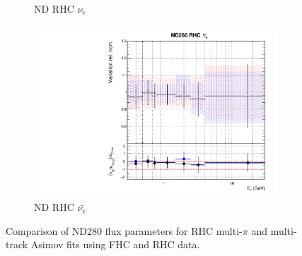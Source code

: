 \begin{figure}[t]
\begin{subfigure}{0.42\textwidth}
  \caption{ND RHC $\nu_{e}$}
\end{subfigure}
\begin{subfigure}{0.42\textwidth}
  \centering
  \includegraphics[width=0.75\linewidth]{figs/rhcmpasmvflux7}
  \caption{ND RHC $\bar{\nu_e}$}
\end{subfigure}
\caption{Comparison of ND280 flux parameters for RHC multi-$\pi$ and multi-track Asimov fits using FHC and RHC data.}
\label{fig:rhcmpiasmvND}
\end{figure}

